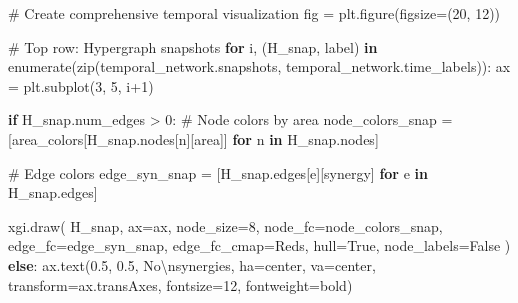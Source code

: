 \documentclass[
  11pt,
  letterpaper,
  oneside,
  openany]{book}
\newenvironment{Shaded}{\begin{snugshade}}{\end{snugshade}}
\newcommand{\BuiltInTok}[1]{\textcolor[rgb]{0.00,0.23,0.31}{#1}}
\newcommand{\CharTok}[1]{\textcolor[rgb]{0.13,0.47,0.30}{#1}}
\newcommand{\CommentTok}[1]{\textcolor[rgb]{0.37,0.37,0.37}{#1}}
\newcommand{\ControlFlowTok}[1]{\textcolor[rgb]{0.00,0.23,0.31}{\textbf{#1}}}
\newcommand{\DecValTok}[1]{\textcolor[rgb]{0.68,0.00,0.00}{#1}}
\newcommand{\FloatTok}[1]{\textcolor[rgb]{0.68,0.00,0.00}{#1}}
\newcommand{\KeywordTok}[1]{\textcolor[rgb]{0.00,0.23,0.31}{\textbf{#1}}}
\newcommand{\NormalTok}[1]{\textcolor[rgb]{0.00,0.23,0.31}{#1}}
\newcommand{\OperatorTok}[1]{\textcolor[rgb]{0.37,0.37,0.37}{#1}}
\newcommand{\StringTok}[1]{\textcolor[rgb]{0.13,0.47,0.30}{#1}}
\newcommand{\VariableTok}[1]{\textcolor[rgb]{0.07,0.07,0.07}{#1}}
\begin{document}
\begin{Shaded}
\begin{Highlighting}[]
\CommentTok{\# Create comprehensive temporal visualization}
\NormalTok{fig }\OperatorTok{=}\NormalTok{ plt.figure(figsize}\OperatorTok{=}\NormalTok{(}\DecValTok{20}\NormalTok{, }\DecValTok{12}\NormalTok{))}

\CommentTok{\# Top row: Hypergraph snapshots}
\ControlFlowTok{for}\NormalTok{ i, (H\_snap, label) }\KeywordTok{in} \BuiltInTok{enumerate}\NormalTok{(}\BuiltInTok{zip}\NormalTok{(temporal\_network.snapshots, }
\NormalTok{                                        temporal\_network.time\_labels)):}
\NormalTok{    ax }\OperatorTok{=}\NormalTok{ plt.subplot(}\DecValTok{3}\NormalTok{, }\DecValTok{5}\NormalTok{, i}\OperatorTok{+}\DecValTok{1}\NormalTok{)}
    
    \ControlFlowTok{if}\NormalTok{ H\_snap.num\_edges }\OperatorTok{\textgreater{}} \DecValTok{0}\NormalTok{:}
        \CommentTok{\# Node colors by area}
\NormalTok{        node\_colors\_snap }\OperatorTok{=}\NormalTok{ [area\_colors[H\_snap.nodes[n][}\StringTok{\textquotesingle{}area\textquotesingle{}}\NormalTok{]] }
                           \ControlFlowTok{for}\NormalTok{ n }\KeywordTok{in}\NormalTok{ H\_snap.nodes]}
        
        \CommentTok{\# Edge colors}
\NormalTok{        edge\_syn\_snap }\OperatorTok{=}\NormalTok{ [H\_snap.edges[e][}\StringTok{\textquotesingle{}synergy\textquotesingle{}}\NormalTok{] }\ControlFlowTok{for}\NormalTok{ e }\KeywordTok{in}\NormalTok{ H\_snap.edges]}
        
\NormalTok{        xgi.draw(}
\NormalTok{            H\_snap,}
\NormalTok{            ax}\OperatorTok{=}\NormalTok{ax,}
\NormalTok{            node\_size}\OperatorTok{=}\DecValTok{8}\NormalTok{,}
\NormalTok{            node\_fc}\OperatorTok{=}\NormalTok{node\_colors\_snap,}
\NormalTok{            edge\_fc}\OperatorTok{=}\NormalTok{edge\_syn\_snap,}
\NormalTok{            edge\_fc\_cmap}\OperatorTok{=}\StringTok{\textquotesingle{}Reds\textquotesingle{}}\NormalTok{,}
\NormalTok{            hull}\OperatorTok{=}\VariableTok{True}\NormalTok{,}
\NormalTok{            node\_labels}\OperatorTok{=}\VariableTok{False}
\NormalTok{        )}
    \ControlFlowTok{else}\NormalTok{:}
\NormalTok{        ax.text(}\FloatTok{0.5}\NormalTok{, }\FloatTok{0.5}\NormalTok{, }\StringTok{\textquotesingle{}No}\CharTok{\textbackslash{}n}\StringTok{synergies\textquotesingle{}}\NormalTok{, ha}\OperatorTok{=}\StringTok{\textquotesingle{}center\textquotesingle{}}\NormalTok{, va}\OperatorTok{=}\StringTok{\textquotesingle{}center\textquotesingle{}}\NormalTok{,}
\NormalTok{               transform}\OperatorTok{=}\NormalTok{ax.transAxes, fontsize}\OperatorTok{=}\DecValTok{12}\NormalTok{, fontweight}\OperatorTok{=}\StringTok{\textquotesingle{}bold\textquotesingle{}}\NormalTok{)}
    

\end{Highlighting}
\end{Shaded}
\end{document}
